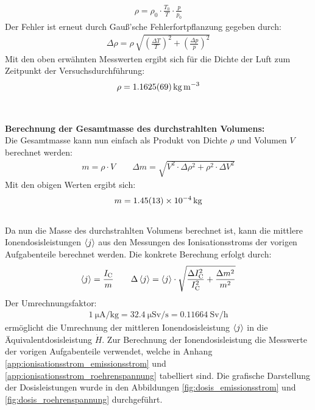 \documentclass[11pt, a4paper]{article}
\numberwithin{equation}{section}
\begin{document}
\begin{align}
	\rho = \rho_0 \cdot \frac{T_0}{T} \cdot \frac{p}{p_0}
\end{align}
Der Fehler ist erneut durch Gauß'sche Fehlerfortpflanzung gegeben durch:
\begin{align}
	\Delta \rho = \rho \, \sqrt{ \left( \frac{\Delta T}{T} \right)^2 + \left( \frac{\Delta p}{p} \right)^2}
\end{align}
Mit den oben erwähnten Messwerten ergibt sich für die Dichte der Luft zum Zeitpunkt der Versuchsdurchführung:
\begin{align}
	\rho = \SI{1.1625 +- 0.0069}{\kilogram\per\metre\cubed}
\end{align}\\
\\
\textbf{Berechnung der Gesamtmasse des durchstrahlten Volumens:}\\
Die Gesamtmasse kann nun einfach als Produkt von Dichte $\rho$ und Volumen $V$ berechnet werden:
\begin{align}
	m = \rho \cdot V \qquad \Delta m = \sqrt{V^2 \cdot \Delta \rho^2 + \rho^2 \cdot \Delta V^2}
\end{align}
Mit den obigen Werten ergibt sich:
\begin{align}
	m = \SI{1.45 +- 0.13e-4}{kg}
\end{align}\\
Da nun die Masse des durchstrahlten Volumens berechnet ist, kann die mittlere Ionendosisleistungen $\braket{j}$ aus den Messungen des Ionisationsstroms der vorigen Aufgabenteile berechnet werden.
Die konkrete Berechung erfolgt durch:
\begin{align}
	\braket{j} = \frac{I_\mathrm{C}}{m} \qquad \Delta \braket{j} = \braket{j} \cdot \sqrt{\frac{\Delta I_\mathrm{C}^2}{I_\mathrm{C}^2} + \frac{\Delta m^2}{m^2}}
	\label{eq:fehler_dosisleistung}
\end{align}
Der Umrechnungsfaktor:
\begin{align*}
	\SI{1}{\micro\ampere\per\kilogram} = \SI{32.4}{\micro\sievert\per\second} = \SI{0.11664}{\sievert\per\hour}
\end{align*}
ermöglicht die Umrechnung der mittleren Ionendosisleistung $\braket{j}$ in die Äquivalentdosisleistung $\dot{H}$.
Zur Berechnung der Ionendosisleistung die Messwerte der vorigen Aufgabenteile verwendet, welche in Anhang \ref{app:ionisationsstrom_emissionsstrom} und \ref{app:ionisationsstrom_roehrenspannung} tabelliert sind.
Die grafische Darstellung der Dosisleistungen wurde in den Abbildungen \ref{fig:dosis_emissionsstrom} und \ref{fig:dosis_roehrenspannung} durchgeführt.
\end{document}
